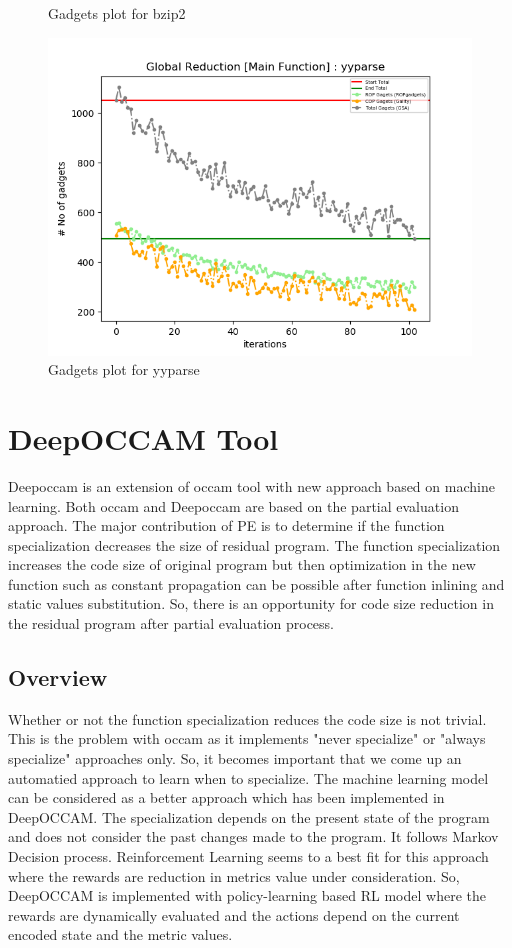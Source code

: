 \documentclass{relatorio}
\begin{document}
\begin{figure}[H]
	\caption{Gadgets plot for \color{blue} bzip2}%
	\label{fig:plant}
	\centering
	\captionsetup{justification=centering}
	\includegraphics[width=0.65\linewidth]{imgs/chisel_gadgets_yyparse_plot.png}
	\caption{Gadgets plot for \color{blue} yyparse}%
	\label{fig:plant}
\end{figure}

\section{DeepOCCAM Tool}%
\label{Tools}

Deepoccam is an extension of occam tool with new approach based on machine learning. Both occam and Deepoccam are based on the partial evaluation approach.
The major contribution of PE is to determine if the function specialization decreases the size of residual program. The function specialization increases the code
size of original program but then optimization in the new function  such as constant propagation can be possible after function inlining and static values substitution.
So, there is an opportunity for code size reduction in the residual program after partial evaluation process. 

\subsection{Overview}%
\label{Tools}

Whether or not the function specialization reduces the code size is not trivial. 
This is the problem with occam as it implements "never specialize" or "always specialize" approaches only. So, it becomes important that we come up an automatied approach to learn 
when to specialize. The machine learning model can be considered as a better approach which has been implemented in DeepOCCAM. The specialization depends on the present state of the program 
and does not consider the past changes made to the program. It follows Markov Decision process. Reinforcement Learning seems to a best fit for this approach where the rewards are reduction 
in metrics value under consideration. So, DeepOCCAM is implemented with policy-learning based RL model where the rewards are dynamically evaluated and the actions depend on the current encoded state 
and the metric values.
\end{document}
